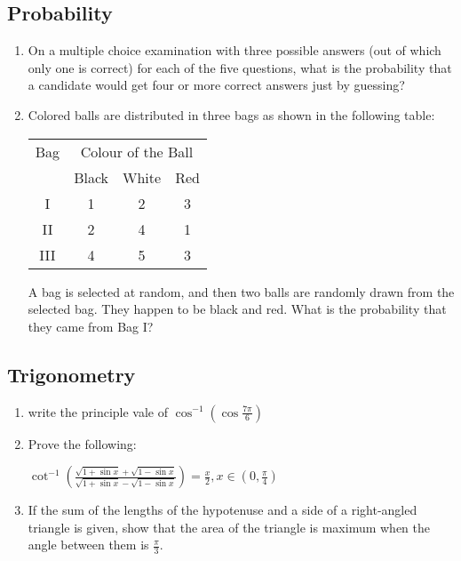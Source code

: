 \documentclass{article}
\begin{document}
\subsection*{Probability}                              
\begin{enumerate}                                      
\item On a multiple choice examination with three possible answers (out of which only one is correct) for each of the five questions, what is the probability that a candidate would get four or more correct answers just by guessing?  

\item Colored balls are distributed in three bags as shown in the following table:

\begin{table}[h]                                                         
\centering
{       
\begin{tabular}{|c|c|c|c|}
\hline                                                              
Bag & \multicolumn{3}{c|}{Colour of the Ball} \\                    
\cline{2-4}                                                         
& Black & White & Red \\                                           
\hline
I & 1 & 2 & 3 \\                                                   
\hline                                                              
II & 2 & 4 & 1 \\                                                  
\hline                                                             
III & 4 & 5 & 3 \\                                                  
\hline

\end{tabular} } 

\end{table}
A bag is selected at random, and then two balls are randomly drawn from the selected bag. They happen to be black and red. What is the probability that they came from Bag I?
\end{enumerate}

\subsection*{Trigonometry}
\begin{enumerate}
\item 
write the principle vale of $\cos^{-1} \left(\cos\frac{7\pi}{6}\right)
$
\item Prove the following:\\
\begin{center}
$\cot^{-1}\left(\frac{\sqrt{1 + \sin x} + \sqrt{1 - \sin x}}{\sqrt{1 + \sin x} - \sqrt{1 - \sin x}}\right) = \frac{x}{2}, x\in  \left({0},\frac{\pi}{4}\right)$
\end{center}
\item 
If the sum of the lengths of the hypotenuse and a side of a right-angled triangle is given, show that the area of the triangle is maximum when the angle between them is $\frac{\pi}{3}$. 
\end{enumerate}
\end{document}

